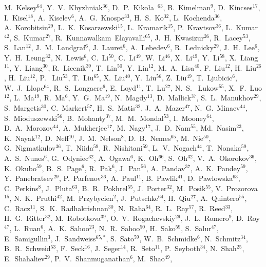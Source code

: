 {M.~Kelsey$^{64}$,
Y.~V.~Khyzhniak$^{36}$,
D.~P.~Kiko\l{}a~$^{63}$,
B.~Kimelman$^{9}$,
D.~Kincses$^{17}$,
I.~Kisel$^{18}$,
A.~Kiselev$^{6}$,
A.~G.~Knospe$^{33}$,
H.~S.~Ko$^{32}$,
L.~Kochenda$^{36}$,
A.~Korobitsin$^{29}$,
L.~K.~Kosarzewski$^{15}$,
L.~Kramarik$^{15}$,
P.~Kravtsov$^{36}$,
L.~Kumar$^{42}$,
S.~Kumar$^{27}$,
R.~Kunnawalkam~Elayavalli$^{65}$,
J.~H.~Kwasizur$^{26}$,
R.~Lacey$^{53}$,
S.~Lan$^{12}$,
J.~M.~Landgraf$^{6}$,
J.~Lauret$^{6}$,
A.~Lebedev$^{6}$,
R.~Lednicky$^{29}$,
J.~H.~Lee$^{6}$,
Y.~H.~Leung$^{32}$,
N.~Lewis$^{6}$,
C.~Li$^{50}$,
C.~Li$^{49}$,
W.~Li$^{46}$,
X.~Li$^{49}$,
Y.~Li$^{58}$,
X.~Liang$^{11}$,
Y.~Liang$^{30}$,
R.~Licenik$^{39}$,
T.~Lin$^{50}$,
Y.~Lin$^{12}$,
M.~A.~Lisa$^{40}$,
F.~Liu$^{12}$,
H.~Liu$^{26}$,
H.~Liu$^{12}$,
P.~ Liu$^{53}$,
T.~Liu$^{65}$,
X.~Liu$^{40}$,
Y.~Liu$^{56}$,
Z.~Liu$^{49}$,
T.~Ljubicic$^{6}$,
W.~J.~Llope$^{64}$,
R.~S.~Longacre$^{6}$,
E.~Loyd$^{11}$,
T.~Lu$^{27}$,
N.~S.~ Lukow$^{55}$,
X.~F.~Luo$^{12}$,
L.~Ma$^{19}$,
R.~Ma$^{6}$,
Y.~G.~Ma$^{19}$,
N.~Magdy$^{13}$,
D.~Mallick$^{37}$,
S.~L.~Manukhov$^{29}$,
S.~Margetis$^{30}$,
C.~Markert$^{57}$,
H.~S.~Matis$^{32}$,
J.~A.~Mazer$^{47}$,
N.~G.~Minaev$^{44}$,
S.~Mioduszewski$^{56}$,
B.~Mohanty$^{37}$,
M.~M.~Mondal$^{53}$,
I.~Mooney$^{64}$,
D.~A.~Morozov$^{44}$,
A.~Mukherjee$^{17}$,
M.~Nagy$^{17}$,
J.~D.~Nam$^{55}$,
Md.~Nasim$^{23}$,
K.~Nayak$^{12}$,
D.~Neff$^{10}$,
J.~M.~Nelson$^{8}$,
D.~B.~Nemes$^{65}$,
M.~Nie$^{50}$,
G.~Nigmatkulov$^{36}$,
T.~Niida$^{59}$,
R.~Nishitani$^{59}$,
L.~V.~Nogach$^{44}$,
T.~Nonaka$^{59}$,
A.~S.~Nunes$^{6}$,
G.~Odyniec$^{32}$,
A.~Ogawa$^{6}$,
K.~Oh$^{66}$,
S.~Oh$^{32}$,
V.~A.~Okorokov$^{36}$,
K.~Okubo$^{59}$,
B.~S.~Page$^{6}$,
R.~Pak$^{6}$,
J.~Pan$^{56}$,
A.~Pandav$^{37}$,
A.~K.~Pandey$^{59}$,
Y.~Panebratsev$^{29}$,
P.~Parfenov$^{36}$,
A.~Paul$^{11}$,
B.~Pawlik$^{41}$,
D.~Pawlowska$^{63}$,
C.~Perkins$^{8}$,
J.~Pluta$^{63}$,
B.~R.~Pokhrel$^{55}$,
J.~Porter$^{32}$,
M.~Posik$^{55}$,
V.~Prozorova$^{15}$,
N.~K.~Pruthi$^{42}$,
M.~Przybycien$^{2}$,
J.~Putschke$^{64}$,
H.~Qiu$^{27}$,
A.~Quintero$^{55}$,
C.~Racz$^{11}$,
S.~K.~Radhakrishnan$^{30}$,
N.~Raha$^{64}$,
R.~L.~Ray$^{57}$,
R.~Reed$^{33}$,
H.~G.~Ritter$^{32}$,
M.~Robotkova$^{39}$,
O.~V.~Rogachevskiy$^{29}$,
J.~L.~Romero$^{9}$,
D.~Roy$^{47}$,
L.~Ruan$^{6}$,
A.~K.~Sahoo$^{23}$,
N.~R.~Sahoo$^{50}$,
H.~Sako$^{59}$,
S.~Salur$^{47}$,
E.~Samigullin$^{3}$,
J.~Sandweiss$^{65,*}$,
S.~Sato$^{59}$,
W.~B.~Schmidke$^{6}$,
N.~Schmitz$^{34}$,
B.~R.~Schweid$^{53}$,
F.~Seck$^{16}$,
J.~Seger$^{14}$,
R.~Seto$^{11}$,
P.~Seyboth$^{34}$,
N.~Shah$^{25}$,
E.~Shahaliev$^{29}$,
P.~V.~Shanmuganathan$^{6}$,
M.~Shao$^{49}$,
}
